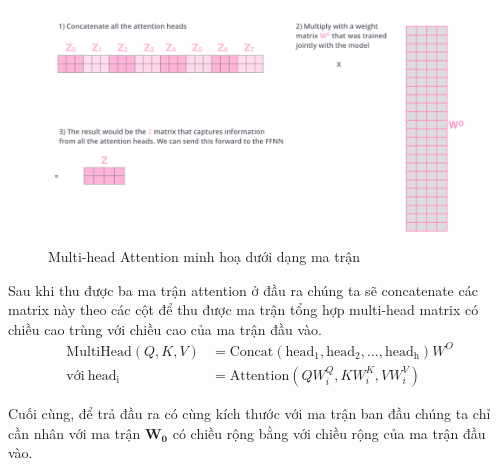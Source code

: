 \begin{enumerate}[label=\textbf{\arabic*}]
          \begin{figure}[htb]
            \centering
            \includegraphics[width=\textwidth]{image/multi-head-illustration.png}
            \caption{Multi-head Attention minh hoạ dưới dạng ma trận \cite{webpage27}}
            \label{figure:multi-head-illustration}
        \end{figure}

          Sau khi thu được ba ma trận attention ở đầu ra chúng ta sẽ concatenate các matrix này theo các cột để thu được ma trận tổng hợp multi-head matrix có chiều cao trùng với chiều cao của ma trận đầu vào.
          \begin{align}
              \mathrm{MultiHead}(Q, K, V) & = \mathrm{Concat}(\mathrm{head_1},\mathrm{head_2}, ..., \mathrm{head_h})W^O \\
              \text{với}~\mathrm{head_i}  & = \mathrm{Attention}(QW^Q_i, KW^K_i, VW^V_i)
          \end{align}


          Cuối cùng, để trả đầu ra có cùng kích thước với ma trận ban đầu chúng ta chỉ cần nhân với ma trận $\mathbf{W}_\mathbf{0}$ có chiều rộng bằng với chiều rộng của ma trận đầu vào.
\end{enumerate}

